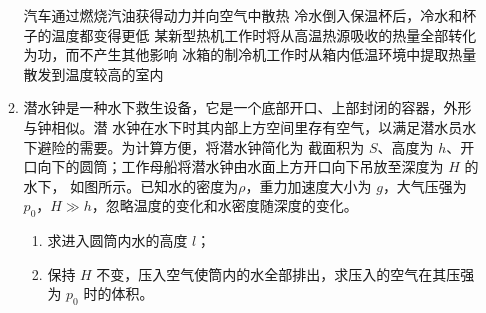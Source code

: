 \begin{enumerate}
\begin{enumerate}
\fourchoices
{汽车通过燃烧汽油获得动力并向空气中散热}
{冷水倒入保温杯后，冷水和杯子的温度都变得更低}
{某新型热机工作时将从高温热源吸收的热量全部转化为功，而不产生其他影响}
{冰箱的制冷机工作时从箱内低温环境中提取热量散发到温度较高的室内}




\item 
潜水钟是一种水下救生设备，它是一个底部开口、上部封闭的容器，外形与钟相似。潜
水钟在水下时其内部上方空间里存有空气，以满足潜水员水下避险的需要。为计算方便，将潜水钟简化为
截面积为 $ S $、高度为 $ h $、开口向下的圆筒；工作母船将潜水钟由水面上方开口向下吊放至深度为 $ H $ 的水下，
如图所示。已知水的密度为$ \rho $，重力加速度大小为 $ g $，大气压强为 $ p_{0} $，$H \gg h$，忽略温度的变化和水密度随深度的变化。
\begin{enumerate}
\item
求进入圆筒内水的高度 $ l $；
\item 
保持 $ H $ 不变，压入空气使筒内的水全部排出，求压入的空气在其压强为 $ p_{0} $ 时的体积。
\end{enumerate}
\begin{figure}[h!]
\flushright

\end{figure}








\end{enumerate}
\end{enumerate}

